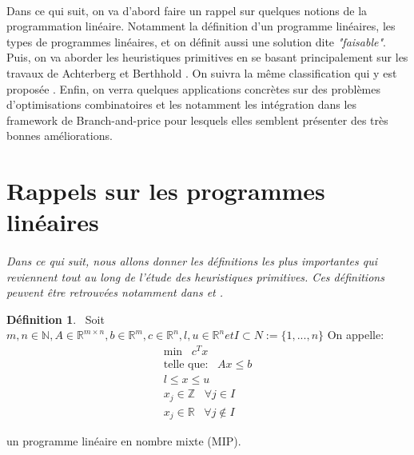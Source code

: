 \documentclass[12pt,a4paper,oneside]{book}
\theoremstyle{definition}
\newtheorem{definition}{Définition}[section]
\newcommand{\R}{\mathbb{R}}
\newcommand{\N}{\mathbb{N}}
\begin{document}
	\paragraph{}
	Dans ce qui suit, on va d’abord faire un rappel sur quelques notions de la programmation linéaire. Notamment la définition d’un programme linéaires, les types de programmes linéaires, et on définit aussi une solution dite \textit{"faisable"}. Puis, on va aborder les heuristiques primitives en se basant principalement sur les travaux de Achterberg et Berthhold \cite{berthold2006}. On suivra la même classification qui y est proposée . Enfin, on verra quelques applications concrètes sur des problèmes d’optimisations combinatoires et les notamment les intégration dans les framework de Branch-and-price pour lesquels elles semblent présenter des très bonnes améliorations.
	
	\section{Rappels sur les programmes linéaires}
	\paragraph{}
	\textit{Dans ce qui suit, nous allons donner les définitions les plus importantes qui reviennent tout au long de l’étude des heuristiques primitives. Ces définitions peuvent être retrouvées notamment dans \cite{berthold2006} et \cite{Hendel2011}. %
	}
	
	\begin{definition} \label{def:defmip} \ 
		Soit $m,n \in \N, A \in \R^{m \times n}, b \in \R^m, c \in \R^n, l,u \in \R^n et I \subset N := \{1,...,n\} $
		On appelle:\\
		
		\[
		\begin{aligned}
		\text{min} \hspace{10pt}  c^T x \\
		\text{telle que:} \hspace{10pt} Ax \leq b \\ 
		l \leq x \leq u \\
		x_j \in \mathbb{Z} \hspace{10pt} \forall j \in I \\
		x_j \in \R \hspace{10pt} \forall j \notin I 
		\end{aligned}
		\]
		
		
		un programme linéaire en nombre mixte (MIP).
	\end{definition}
	
\end{document}
